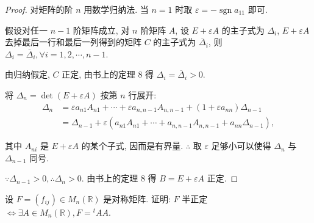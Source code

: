 \documentclass[color=black,device=normal,lang=cn,mode=geye]{elegantnote}
\begin{document}
\begin{proof}
    对矩阵的阶 $n$ 用数学归纳法. 当 $n=1$ 时取 $\varepsilon=-\operatorname{sgn}a_{11}$ 即可.

    假设对任一 $n-1$ 阶矩阵成立, 对 $n$ 阶矩阵 $A$, 设 $E+\varepsilon A$ 的主子式为 $\Delta_i$, $E+\varepsilon A$ 去掉最后一行和最后一列得到的矩阵 $C$ 的主子式为 $\overline{\Delta}_i$, 则 $\Delta_i=\overline{\Delta}_i,\forall i=1,2,\cdots,n-1$.

    由归纳假定, $C$ 正定, 由书上的定理 8 得 $\Delta_i=\overline{\Delta}_i>0$.
    
    将 $\Delta_n=\det(E+\varepsilon A)$ 按第 $n$ 行展开:
    \begin{align*}
        \Delta_n & =\varepsilon a_{n1}A_{n1}+\cdots+\varepsilon a_{n,n-1}A_{n,n-1}+(1+\varepsilon a_{nn})\Delta_{n-1} \\
        & =\Delta_{n-1}+\varepsilon(a_{n1}A_{n1}+\cdots+a_{n,n-1}A_{n,n-1}+a_{nn}\Delta_{n-1}),
    \end{align*}

    其中 $A_{ni}$ 是 $E+\varepsilon A$ 的某个子式, 因而是有界量. $\therefore$ 取 $\varepsilon$ 足够小可以使得 $\Delta_n$ 与 $\Delta_{n-1}$ 同号.
    
    $\because\Delta_{n-1}>0,\therefore\Delta_n>0$. 由书上的定理 8 得 $B=E+\varepsilon A$ 正定.
\end{proof}
\begin{exercisec}\label{exc6}
    设 $F=(f_{ij})\in M_n(\mathbb{R})$ 是对称矩阵. 证明: $F$ 半正定 $\Leftrightarrow\exists A\in M_n(\mathbb{R}),F={}^tAA$.
\end{exercisec}
\end{document}
